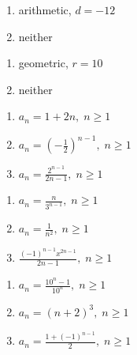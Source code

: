 \documentclass{ximera}
\begin{document}
\begin{multicols}{2}
\begin{enumerate}
\setcounter{enumi}{\value{HW}}


\item  arithmetic, $d = -12$

\item  neither

\setcounter{HW}{\value{enumi}}
\end{enumerate}
\end{multicols}

\begin{multicols}{2}
\begin{enumerate}
\setcounter{enumi}{\value{HW}}


\item  geometric, $r = 10$

\item  neither


\setcounter{HW}{\value{enumi}}
\end{enumerate}
\end{multicols}

\begin{multicols}{3}
\begin{enumerate}
\setcounter{enumi}{\value{HW}}

\item $a_{n} = 1 + 2n, \; n \geq 1$
\item $a_{n} = \left(-\frac{1}{2}\right)^{n - 1}, \; n \geq 1$
\item $a_{n} = \frac{2^{n - 1}}{2n - 1}, \; n \geq 1$

\setcounter{HW}{\value{enumi}}
\end{enumerate}
\end{multicols}

\begin{multicols}{3}
\begin{enumerate}
\setcounter{enumi}{\value{HW}}

\item $a_{n} = \frac{n}{3^{n - 1}}, \; n \geq 1$
\item $a_{n} = \frac{1}{n^{2}}, \; n \geq 1$
\item $\frac{(-1)^{n - 1}x^{2n - 1}}{2n -1}, \; n \geq 1$

\setcounter{HW}{\value{enumi}}
\end{enumerate}
\end{multicols}

\begin{multicols}{3}
\begin{enumerate}
\setcounter{enumi}{\value{HW}}

\item $a_{n} = \frac{10^{n} - 1}{10^{n}}, \; n \geq 1$
\item $a_{n} = (n + 2)^{3}, \; n \geq 1$
\item $a_{n} = \frac{1 + (-1)^{n-1}}{2}, \; n \geq 1$
 
\setcounter{HW}{\value{enumi}}
\end{enumerate}
\end{multicols}
\end{document}
